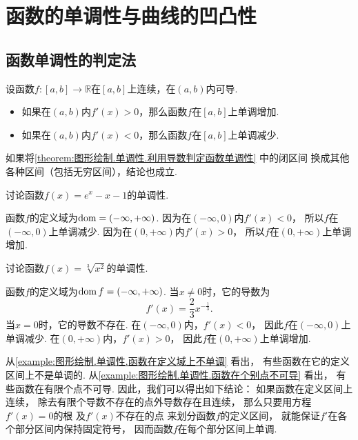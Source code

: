 \section{函数的单调性与曲线的凹凸性}
\subsection{函数单调性的判定法}
\begin{theorem}[函数的单调性]\label{theorem:图形绘制.单调性.利用导数判定函数单调性}
设函数\(f\colon[a,b]\to\mathbb{R}\)在\([a,b]\)上连续，在\((a,b)\)内可导.
\begin{itemize}
	\item 如果在\((a,b)\)内\(f'(x)>0\)，那么函数\(f\)在\([a,b]\)上单调增加.
	\item 如果在\((a,b)\)内\(f'(x)<0\)，那么函数\(f\)在\([a,b]\)上单调减少.
\end{itemize}
\end{theorem}
\begin{remark}
如果将\cref{theorem:图形绘制.单调性.利用导数判定函数单调性} 中的闭区间
换成其他各种区间（包括无穷区间），结论也成立.
\end{remark}
\begin{example}\label{example:图形绘制.单调性.函数在定义域上不单调}
讨论函数\(f(x) = e^x - x - 1\)的单调性.
\begin{solution}
函数\(f\)的定义域为\(\operatorname{dom} = (-\infty,+\infty)\).
因为在\((-\infty,0)\)内\(f'(x)<0\)，
所以\(f\)在\((-\infty,0)\)上单调减少.
因为在\((0,+\infty)\)内\(f'(x)>0\)，
所以\(f\)在\((0,+\infty)\)上单调增加.
\end{solution}
\end{example}
\begin{example}\label{example:图形绘制.单调性.函数在个别点不可导}
讨论函数\(f(x) = \sqrt[3]{x^2}\)的单调性.
\begin{solution}
函数\(f\)的定义域为\(\operatorname{dom} f = (-\infty,+\infty)\).
当\(x\neq0\)时，它的导数为\[
	f'(x) = \frac23 x^{-\frac13}.
\]
当\(x=0\)时，它的导数不存在.
在\((-\infty,0)\)内，\(f'(x)<0\)，
因此\(f\)在\((-\infty,0)\)上单调减少.
在\((0,+\infty)\)内，\(f'(x)>0\)，
因此\(f\)在\((0,+\infty)\)上单调增加.
\end{solution}
\end{example}
\begin{remark}
从\cref{example:图形绘制.单调性.函数在定义域上不单调} 看出，
有些函数在它的定义区间上不是单调的.
从\cref{example:图形绘制.单调性.函数在个别点不可导} 看出，
有些函数在有限个点不可导.
因此，我们可以得出如下结论：
如果函数在定义区间上连续，
除去有限个导数不存在的点外导数存在且连续，
那么只要用方程\(f'(x) = 0\)的根
及\(f'(x)\)不存在的点
来划分函数\(f\)的定义区间，
就能保证\(f'\)在各个部分区间内保持固定符号，
因而函数\(f\)在每个部分区间上单调.
\end{remark}
